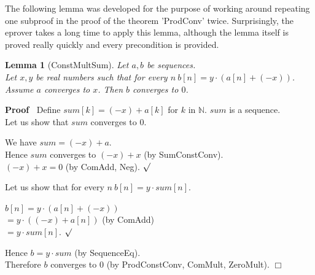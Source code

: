\documentclass{article}
\newenvironment{forthel}{\begin{leftbar}}{\end{leftbar}}
\newenvironment{proof}{\noindent\textbf{Proof\ }}{\hspace*{\fill}$\Box$\medskip}
\newenvironment{subproof}{\begin{list}{}{}
		\item[\text{Proof}]}{\hfill $\surd$ \end{list}}
\newtheorem{lemma}{Lemma}
\newcommand{\NN}{\mathbb{N}}
\newcommand{\cdottwo}{\cdot}
\newcommand{\plustwo}{+}
\newcommand{\dotequal}{=}
\begin{document}
\noindent The following lemma was developed for the purpose of working around repeating one subproof in the proof of the theorem 'ProdConv' twice. Surprisingly, the eprover takes a long time to apply this lemma, although the lemma itself is proved really quickly and every precondition is provided.

\begin{forthel}

	\begin{lemma}[ConstMultSum]
	Let $a,b$ be sequences. \\Let $x,y$ be real numbers such that for every $n\ b[n] = y \cdot (a[n] + (-x))$. \\Assume $a$ converges to $x$.
	Then $b$ converges to $0$.
	\end{lemma}
	\begin{proof}
	Define $sum[k] = (-x) + a[k]$ for $k$ in $\NN$.
	$sum$ is a sequence.
	\\Let us show that $sum$ converges to $0$.
	\begin{subproof}
	We have $sum = (-x) \plustwo a$.
	\\Hence $sum$ converges to $(-x) + x$ (by SumConstConv).
	\\$(-x) + x = 0$ (by ComAdd, Neg).
	\end{subproof}
	Let us show that for every $n\ b[n] = y \cdot sum[n]$.
	\begin{subproof}
	$b[n] \dotequal y \cdot (a[n] + (-x))$
	\\$\dotequal y \cdot ((-x) + a[n])$ (by ComAdd)
	\\$\dotequal y \cdot sum[n]$.
	\end{subproof}
	Hence $b = y \cdottwo sum$ (by SequenceEq).
	\\Therefore $b$ converges to $0$ (by ProdConstConv, ComMult, ZeroMult).
	\end{proof}
	

\end{forthel}
\end{document}
